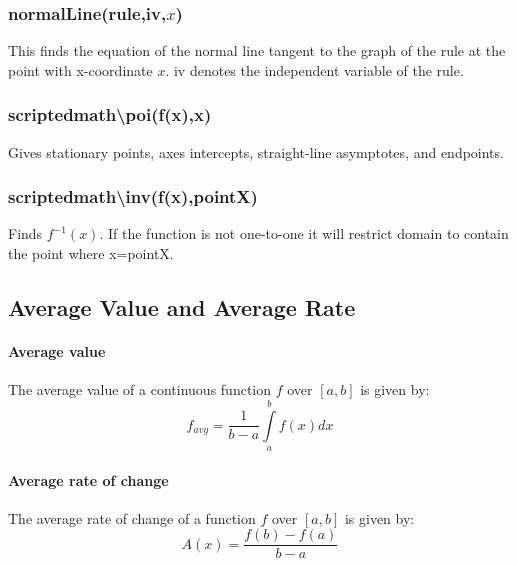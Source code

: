 \documentclass[a4paper,twoside,10pt]{article}
\begin{document}
			\subsubsection{normalLine(rule,iv,$x$)}
			This finds the equation of the normal line tangent to the graph of the rule at the point with x-coordinate $x$. iv denotes the independent variable of the rule.
			
			\subsubsection{scriptedmath\textbackslash poi(f(x),x)} Gives stationary points, axes intercepts, straight-line asymptotes, and endpoints.
			\subsubsection{scriptedmath\textbackslash inv(f(x),pointX)} Finds $f^{-1}(x)$. If the function is not one-to-one it will restrict domain to contain the point where x=pointX.
		\subsection{Average Value and Average Rate}
			\paragraph{Average value} The average value of a continuous function $f$ over $[a,b]$ is given by:
			\[
			f_{avg}=\frac{1}{b-a}\int\limits_a^bf(x)dx
			\]
			\paragraph{Average rate of change} The average rate of change of a function $f$ over $[a,b]$ is given by:
			\[
			A(x)=\frac{f(b)-f(a)}{b-a}
			\]
\end{document}
